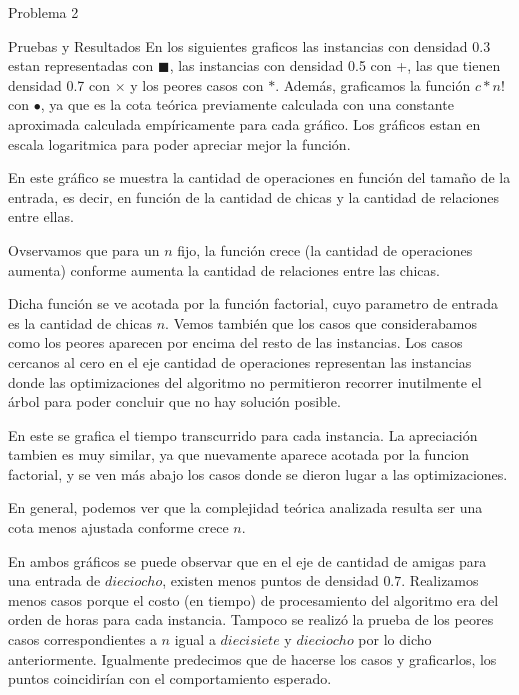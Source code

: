 \begin{section}{Problema 2}
\begin{subsection}{Pruebas y Resultados}
		En los siguientes graficos las instancias con densidad 0.3 estan representadas con {\color{cyan}$\blacksquare$}, las instancias con densidad 0.5 con {\color{red}+}, las que tienen densidad 0.7 con {\color{green}$\times$} y los peores casos con {\color{blue}$\ast$}. Además, graficamos la función $c*n!$ con $\bullet$, ya que es la cota teórica previamente calculada con una constante aproximada calculada empíricamente para cada gráfico.
		Los gráficos estan en escala logaritmica para poder apreciar mejor la función.\VSP
		
		\newpage

		\VSP

		En este gráfico se muestra la cantidad de operaciones en función del tamaño de la entrada, es decir, en función de la cantidad de chicas y la cantidad de relaciones entre ellas.

		Ovservamos que para un $n$ fijo, la función crece (la cantidad de operaciones aumenta) conforme aumenta la cantidad de relaciones entre las chicas.

		Dicha función se ve acotada por la función factorial, cuyo parametro de entrada es la cantidad de chicas $n$. Vemos también que los casos que considerabamos como los peores aparecen por encima del resto de las instancias. Los casos cercanos al cero en el eje cantidad de operaciones representan las instancias donde las optimizaciones del algoritmo no permitieron recorrer inutilmente el árbol para poder concluir que no hay solución posible.\VSP

		\newpage

		\VSP

		En este se grafica el tiempo transcurrido para cada instancia. La apreciación tambien es muy similar, ya que nuevamente aparece acotada por la funcion factorial, y se ven más abajo los casos donde se dieron lugar a las optimizaciones.

		En general, podemos ver que la complejidad teórica analizada resulta ser una cota menos ajustada conforme crece $n$.
		
		En ambos gráficos se puede observar que en el eje de cantidad de amigas para una entrada de $dieciocho$, existen menos puntos de densidad $0.7$. Realizamos menos casos porque el costo (en tiempo) de procesamiento del algoritmo era del orden de horas para cada instancia. Tampoco se realizó la prueba de los peores casos correspondientes a $n$ igual a $diecisiete$ y $dieciocho$ por lo dicho anteriormente. Igualmente predecimos que de hacerse los casos y graficarlos, los puntos coincidirían con el comportamiento esperado.


\end{subsection}
\end{section}
